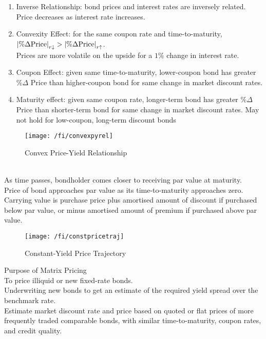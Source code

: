 \begin{remark} 
\begin{enumerate}[label=\roman*.]
\setlength{\itemsep}{0pt}
\item Inverse Relationship: bond prices and interest rates are inversely related.\\
Price decreases as interest rate increases.
\item Convexity Effect: for the same coupon rate and time-to-maturity, $\left\lvert\% \Delta \text{Price}\right\rvert_{r \downarrow} > \left\lvert\% \Delta \text{Price}\right\rvert_{r \uparrow}$.\\
Prices are more volatile on the upside for a $1\%$ change in interest rate.
\item Coupon Effect: given same time-to-maturity, lower-coupon bond has greater $\% \Delta$ Price than higher-coupon bond for same change in market discount rates.
\item Maturity effect: given same coupon rate, longer-term bond has greater $\% \Delta$ Price than shorter-term bond for same change in market discount rates. May not hold for low-coupon, long-term discount bonds
\end{enumerate}
\end{remark}

\begin{figure}[H]
\centering
\texttt{[image: /fi/convexpyrel]}
\caption{Convex Price-Yield Relationship}
\end{figure}

\begin{remark} \\
As time passes, bondholder comes closer to receiving par value at maturity.\\
Price of bond approaches par value as its time-to-maturity approaches zero.\\
Carrying value is purchase price plus amortised amount of discount if purchased below par value, or minus amortised amount of premium if purchased above par value.
\end{remark}

\begin{figure}[H]
\centering
\texttt{[image: /fi/constpricetraj]}
\caption{Constant-Yield Price Trajectory}
\end{figure}

\begin{remark} Purpose of Matrix Pricing\\
To price illiquid or new fixed-rate bonds.\\
Underwriting new bonds to get an estimate of the required yield spread over the benchmark rate.\\
Estimate market discount rate and price based on quoted or flat prices of more frequently traded comparable bonds, with similar time-to-maturity, coupon rates, and credit quality.
\end{remark}


